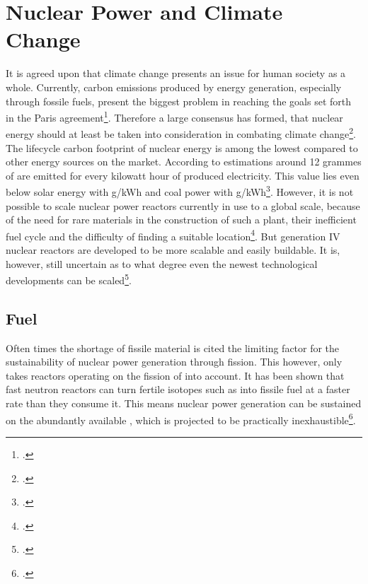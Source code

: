 \chapter{Nuclear Power and Climate Change}
It is agreed upon that climate change presents an issue for human society as a whole. Currently,
carbon emissions produced by energy generation, especially through fossile fuels,
present the biggest problem in reaching the goals set forth in the Paris agreement\footcite{paris}.
Therefore a large consensus has formed, that nuclear energy should at least be taken into consideration
in combating climate change\footcite{nucandclim}.
The lifecycle carbon footprint of nuclear energy is among the lowest compared to other energy
sources on the market. According to estimations around 12 grammes of  are emitted for
every kilowatt hour of produced electricity. This value lies even below solar energy with \unit[40]{g/kWh}
and coal power with \unit[820]{g/kWh}\footcite{ipcc}. However, it is not possible to scale
nuclear power reactors currently in use to a global scale, because of the need for rare materials
in the construction of such a plant, their inefficient fuel cycle and the difficulty of finding a
suitable location\footcite{scale}. But generation IV nuclear reactors are developed to be more
scalable and easily buildable. It is, however, still uncertain as to what degree even the newest
technological developments can be scaled\footcite{GIFAR}.
\section{Fuel}
Often times the shortage of fissile material is cited the limiting factor for the sustainability of
nuclear power generation through fission. This however, only takes reactors operating on the fission
of  into account. It has been shown that fast neutron reactors can turn fertile isotopes
such as  into fissile fuel at a faster rate than they consume it. This means nuclear
power generation can be sustained on the abundantly available , which is projected to
be practically inexhaustible\footcite{inex}.